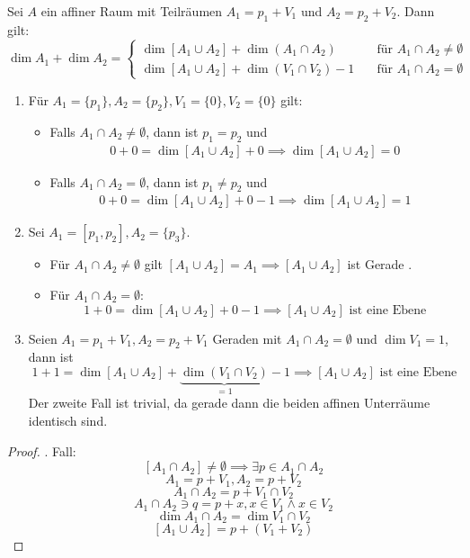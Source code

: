 \documentclass[a4paper, 10pt]{scrbook}
\begin{document}
\begin{thm} 
	\label{thm:8.10}
Sei $A$ ein affiner Raum mit Teilräumen $A_1=p_1+V_1$ und $A_2=p_2+V_2$.
Dann gilt:
\[
	\boxed{
\dim A_1 +\dim A_2 = \begin{cases}
\dim [A_1\cup A_2] + \dim (A_1 \cap A_2) &\quad\text{für } A_1\cap A_2 \neq \emptyset \\
\dim [A_1 \cup A_2] + \dim (V_1 \cap V_2) - 1 &\quad\text{für } A_1\cap A_2 = \emptyset
\end{cases}
}
\]
\begin{ex}
\begin{enumerate}
\item
Für $A_1=\{p_1\}, A_2=\{p_2\}, V_1=\{0\}, V_2=\{0\}$ gilt:
\begin{itemize}
\item Falls $A_1\cap A_2 \neq \emptyset$, dann ist $p_1=p_2$ und
\begin{align*}
	0+0=\dim [A_1\cup A_2] + 0 \implies \dim[A_1\cup A_2] = 0
\end{align*}
\item Falls $A_1\cap A_2 = \emptyset$, dann ist $p_1\neq p_2$ und
\begin{align*}
	0+0= \dim [A_1\cup A_2] + 0 - 1 \implies \dim[A_1\cup A_2] = 1
\end{align*}

\end{itemize}

\item
Sei $A_1=[p_1,p_2], A_2=\{p_3\}$. 
\begin{itemize}
 \item Für $A_1\cap A_2 \neq \emptyset$ gilt $[A_1\cup A_2]=A_1 \implies [A_1 \cup A_2]$ ist Gerade .

\item Für $A_1\cap A_2=\emptyset$:
\[
1+0=\dim [A_1\cup A_2] + 0-1 \implies [A_1\cup A_2] \text{ ist eine Ebene}
\]
\end{itemize}
\item
Seien $A_1=p_1+V_1, A_2=p_2+V_1$ Geraden mit $A_1\cap A_2 = \emptyset$ und $\dim V_1 = 1$, dann ist
\[
	1+1=\dim [A_1 \cup A_2] + \underbrace{\dim (V_1 \cap V_2)}_{=1} - 1 \implies [A_1\cup A_2] \text{ ist eine Ebene}
\]
Der zweite Fall ist trivial, da gerade dann die beiden affinen Unterräume identisch sind. 
\end{enumerate}
\end{ex}

\begin{proof}
	. Fall:
\[
[A_1\cap A_2] \neq \emptyset \implies \exists p\in A_1 \cap A_2 \]\[
A_1=p+V_1, A_2=p+V_2 \]\[
A_1\cap A_2 = p+V_1\cap V_2\]\[
A_1\cap A_2 \ni q=p+x, x\in V_1 \land x\in V_2 \]\[
\dim A_1 \cap A_2 = \dim V_1 \cap V_2
\]
\[
[A_1\cup A_2] = p+(V_1+ V_2)
\]


\end{proof}
\end{thm}
\end{document}
